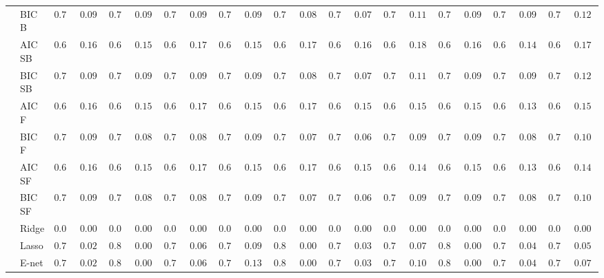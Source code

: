 \begin{tabular}{p{0.2cm}p{1cm}|p{0.6cm}p{0.6cm}|p{0.6cm}p{0.6cm}p{0.6cm}p{0.6cm}p{0.6cm}p{0.6cm}|p{0.6cm}p{0.6cm}p{0.6cm}p{0.6cm}p{0.6cm}p{0.6cm}|p{0.6cm}p{0.6cm}p{0.6cm}p{0.6cm}p{0.6cm}p{0.6cm}}
 & BIC B  & $0.748$ & $0.0926$ & $0.748$ & $0.0926$ & $0.750$ & $0.0916$ & $0.734$ & $0.0987$ & $0.760$ & $0.0804$ & $0.766$ & $0.0755$ & $0.740$ & $0.1155$ & $0.744$ & $0.0988$ & $0.750$ & $0.0916$ & $0.724$ & $0.1296$ \\
 & AIC SB  & $0.616$ & $0.1674$ & $0.620$ & $0.1595$ & $0.602$ & $0.1764$ & $0.634$ & $0.1584$ & $0.612$ & $0.1701$ & $0.616$ & $0.1600$ & $0.616$ & $0.1879$ & $0.604$ & $0.1608$ & $0.632$ & $0.1442$ & $0.602$ & $0.1717$ \\
 & BIC SB  & $0.748$ & $0.0926$ & $0.748$ & $0.0926$ & $0.750$ & $0.0916$ & $0.734$ & $0.0987$ & $0.760$ & $0.0804$ & $0.766$ & $0.0755$ & $0.740$ & $0.1155$ & $0.744$ & $0.0988$ & $0.750$ & $0.0916$ & $0.724$ & $0.1296$ \\
 & AIC F  & $0.618$ & $0.1660$ & $0.624$ & $0.1538$ & $0.624$ & $0.1712$ & $0.654$ & $0.1500$ & $0.614$ & $0.1712$ & $0.642$ & $0.1565$ & $0.672$ & $0.1596$ & $0.612$ & $0.1578$ & $0.658$ & $0.1372$ & $0.648$ & $0.1507$ \\
 & BIC F  & $0.748$ & $0.0926$ & $0.752$ & $0.0858$ & $0.754$ & $0.0892$ & $0.740$ & $0.0921$ & $0.762$ & $0.0789$ & $0.772$ & $0.0697$ & $0.750$ & $0.0959$ & $0.746$ & $0.0979$ & $0.756$ & $0.0833$ & $0.736$ & $0.1097$ \\
 & AIC SF  & $0.618$ & $0.1660$ & $0.624$ & $0.1538$ & $0.624$ & $0.1712$ & $0.654$ & $0.1500$ & $0.614$ & $0.1712$ & $0.644$ & $0.1520$ & $0.680$ & $0.1477$ & $0.612$ & $0.1578$ & $0.658$ & $0.1372$ & $0.650$ & $0.1460$ \\
 & BIC SF  & $0.748$ & $0.0926$ & $0.752$ & $0.0858$ & $0.754$ & $0.0892$ & $0.740$ & $0.0921$ & $0.762$ & $0.0789$ & $0.772$ & $0.0697$ & $0.750$ & $0.0959$ & $0.746$ & $0.0979$ & $0.756$ & $0.0833$ & $0.736$ & $0.1097$ \\
 & Ridge  & $0.000$ & $0.0000$ & $0.000$ & $0.0000$ & $0.000$ & $0.0000$ & $0.000$ & $0.0000$ & $0.000$ & $0.0000$ & $0.000$ & $0.0000$ & $0.000$ & $0.0000$ & $0.000$ & $0.0000$ & $0.000$ & $0.0000$ & $0.000$ & $0.0000$ \\
 & Lasso  & $0.798$ & $0.0200$ & $0.800$ & $0.0000$ & $0.786$ & $0.0652$ & $0.758$ & $0.0997$ & $0.800$ & $0.0000$ & $0.794$ & $0.0343$ & $0.770$ & $0.0772$ & $0.800$ & $0.0000$ & $0.796$ & $0.0400$ & $0.790$ & $0.0522$ \\
 & E-net  & $0.798$ & $0.0200$ & $0.800$ & $0.0000$ & $0.784$ & $0.0677$ & $0.732$ & $0.1340$ & $0.800$ & $0.0000$ & $0.792$ & $0.0394$ & $0.754$ & $0.1019$ & $0.800$ & $0.0000$ & $0.796$ & $0.0400$ & $0.784$ & $0.0735$ \\

\end{tabular}
